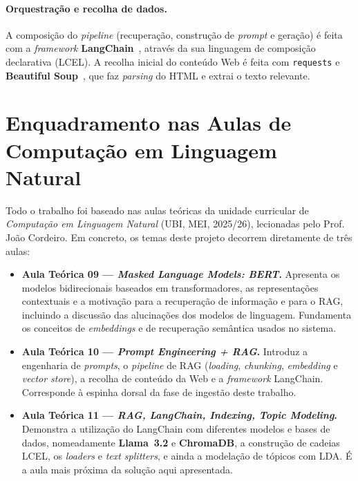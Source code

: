 \documentclass[]{ceurart}
\begin{document}
\paragraph{Orquestração e recolha de dados.}
A composição do \emph{pipeline} (recuperação, construção de \emph{prompt} e
geração) é feita com a \emph{framework} \textbf{LangChain}~\cite{langchain},
através da sua linguagem de composição declarativa (LCEL). A recolha inicial do
conteúdo Web é feita com \texttt{requests} e \textbf{Beautiful
Soup}~\cite{beautifulsoup}, que faz \emph{parsing} do HTML e extrai o texto
relevante.

\section{Enquadramento nas Aulas de Computação em Linguagem Natural}
\label{sec:aulas}

Todo o trabalho foi baseado nas aulas teóricas da unidade curricular de
\emph{Computação em Linguagem Natural} (UBI, MEI, 2025/26), lecionadas pelo
Prof. João Cordeiro. Em concreto, os temas deste projeto decorrem diretamente de
três aulas:

\begin{itemize}
  \item \textbf{Aula Teórica 09 --- \emph{Masked Language Models: BERT}.}
        Apresenta os modelos bidirecionais baseados em transformadores, as
        representações contextuais e a motivação para a recuperação de informação
        e para o RAG, incluindo a discussão das alucinações dos modelos de
        linguagem. Fundamenta os conceitos de \emph{embeddings} e de recuperação
        semântica usados no sistema.
  \item \textbf{Aula Teórica 10 --- \emph{Prompt Engineering + RAG}.}
        Introduz a engenharia de \emph{prompts}, o \emph{pipeline} de RAG
        (\emph{loading}, \emph{chunking}, \emph{embedding} e \emph{vector store}),
        a recolha de conteúdo da Web e a \emph{framework} LangChain. Corresponde
        à espinha dorsal da fase de ingestão deste trabalho.
  \item \textbf{Aula Teórica 11 --- \emph{RAG, LangChain, Indexing, Topic
        Modeling}.} Demonstra a utilização do LangChain com diferentes modelos e
        bases de dados, nomeadamente \textbf{Llama~3.2} e \textbf{ChromaDB}, a
        construção de cadeias LCEL, os \emph{loaders} e \emph{text splitters}, e
        ainda a modelação de tópicos com LDA. É a aula mais próxima da solução
        aqui apresentada.
\end{itemize}
\end{document}
